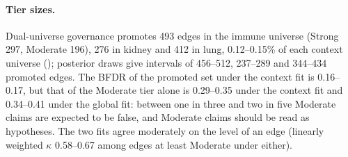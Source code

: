 \documentclass[11pt,a4paper]{article}
\begin{document}
\paragraph{Tier sizes.}
Dual-universe governance promotes 493 edges in the immune universe (Strong 297, Moderate 196), 276 in kidney and 412 in lung, 0.12--0.15\% of each context universe (); posterior draws give intervals of 456--512, 237--289 and 344--434 promoted edges.
The BFDR of the promoted set under the context fit is 0.16--0.17, but that of the Moderate tier alone is 0.29--0.35 under the context fit and 0.34--0.41 under the global fit: between one in three and two in five Moderate claims are expected to be false, and Moderate claims should be read as hypotheses.
The two fits agree moderately on the level of an edge (linearly weighted $\kappa$ 0.58--0.67 among edges at least Moderate under either).
\end{document}
